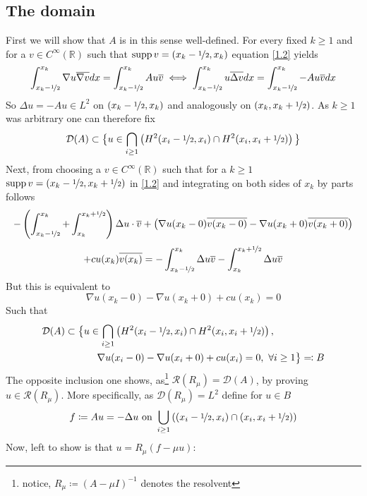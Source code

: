 \documentclass[14pt,a4paper]{scrartcl}
\numberwithin{equation}{section}
\def\supp{\operatorname{supp}}
\newcommand{\R}{\mathbb{R}}
\begin{document}
	\subsection{The domain}
	First we will show that $A$ is in this sense well-defined. For every fixed $k \geq 1$ and for a $v \in C^{\infty}(\R)$ such that $\supp v = (x_{k} - \nicefrac{1}{2}, x_{k})$ equation \ref{1.2} yields
	\[ \int_{x_{k}-\nicefrac{1}{2}}^{x_{k}} \nabla u \overline{\nabla v} dx = \int_{x_{k}-\nicefrac{1}{2}}^{x_{k}} A u \overline{v} \iff \int_{x_{k}-\nicefrac{1}{2}}^{x_{k}} u \overline{\Delta v} dx = \int_{x_{k}-\nicefrac{1}{2}}^{x_{k}} - A u \overline{v} dx \]
	So $\Delta u = - A u \in L^{2}$ on $(x_{k} -\nicefrac{1}{2}, x_{k})$ and analogously on $(x_{k}, x_{k} + \nicefrac{1}{2})$.
	As $k \geq 1$ was arbitrary one can therefore fix
	\[ \mathcal{D}(A) \subset \big\{ u \in \bigcap_{i \geq 1} \left( H^{2}(x_{i}-\nicefrac{1}{2}, x_{i}) \cap H^{2}(x_{i}, x_{i} + \nicefrac{1}{2}) \right) \big\} \]
	Next, from choosing a $v \in C^{\infty}(\R)$ such that for a $k \geq 1$ $\supp v = (x_{k} - \nicefrac{1}{2}, x_{k} + \nicefrac{1}{2})$ in \ref{1.2}  and integrating on both sides of $x_{k}$ by parts follows
	\[ -\left( \int_{x_{k}-\nicefrac{1}{2}}^{x_{k}} + \int_{x_{k}}^{x_{k} + \nicefrac{1}{2}}\right) \Delta u \cdot \overline{v} + \big( \nabla u(x_{k}-0) \overline{v(x_{k} - 0)} - \nabla u(x_{k} + 0)\overline{v(x_{k}+0)} \big) \\ \]
	\[ +  c u(x_{k})\overline{v(x_{k})} = - \int_{x_{k} - \nicefrac{1}{2}}^{x_{k}} \Delta u \overline{v} - \int_{x_{k}}^{x_{k} + \nicefrac{1}{2}} \Delta u \overline{v} \]
	But this is equivalent to
	\[ \nabla u(x_{k}-0) - \nabla u(x_{k}+0) + c u(x_{k}) = 0 \]
	Such that
	\begin{align*}
		\mathcal{D}(A) \subset \big\{ & u \in \bigcap_{i \geq 1} \left( H^{2}(x_{i}-\nicefrac{1}{2}, x_{i}) \cap H^{2}(x_{i}, x_{i} + \nicefrac{1}{2}) \right), \\
			& ~\quad \nabla u(x_{i} - 0) - \nabla u(x_{i} + 0) + c u(x_{i}) = 0 , ~\forall i \geq 1 \big\} \eqqcolon B
	\end{align*} 
	The opposite inclusion one shows, as\footnote{notice, $R_{\mu} \coloneqq (A - \mu I)^{-1}$ denotes the resolvent} $\mathcal{R}(R_{\mu}) = \mathcal{D}(A)$, by proving $u \in \mathcal{R}(R_{\mu})$. More specifically, as $\mathcal{D}(R_{\mu}) = L^{2}$ define for $u \in B$
	\[ f \coloneqq A u = - \Delta u \text{ on } \bigcup_{i \geq 1} \left( (x_{i} - \nicefrac{1}{2}, x_{i}) \cap (x_{i}, x_{i} + \nicefrac{1}{2}) \right) \] 
	Now, left to show is that $u = R_{\mu}(f - \mu u)$:
\end{document}
